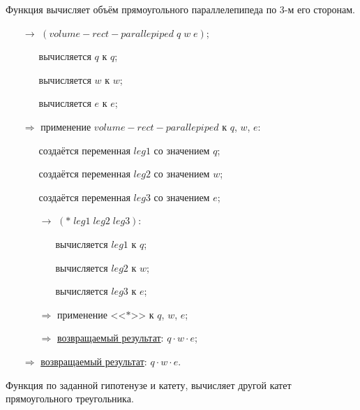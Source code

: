\problem Функция вычисляет объём прямоугольного параллелепипеда по 3-м его сторонам.\\[0.1cm]

\vspace{0.2cm}

\begin{itemize}
	\item[$\longrightarrow$] $(volume\!-\!rect\!-\!parallepiped\; q\; w\; e)$;
	\begin{itemize}
		\item[\textbullet] вычисляется $q$ к $q$;
		\item[\textbullet] вычисляется $w$ к $w$;
		\item[\textbullet] вычисляется $e$ к $e$;
	\end{itemize}
	\item[$\Longrightarrow$] применение $volume\!-\!rect\!-\!parallepiped$ к $q$, $w$, $e$:
	\begin{itemize}
		\item[\textbullet] создаётся переменная $leg1$ со значением $q$;
		\item[\textbullet] создаётся переменная $leg2$ со значением $w$;
		\item[\textbullet] создаётся переменная $leg3$ со значением $e$;
		\item[$\longrightarrow$] $(*\; leg1\; leg2\; leg3)$:
		\begin{itemize}
			\item[\textbullet] вычисляется $leg1$ к $q$;
			\item[\textbullet] вычисляется $leg2$ к $w$;
			\item[\textbullet] вычисляется $leg3$ к $e$;
		\end{itemize}
		\item[$\Longrightarrow$] применение <<$*$>> к $q$, $w$, $e$;
		\item[$\Longrightarrow$] \underline{возвращаемый результат}: $q \cdot w \cdot e$;
	\end{itemize}
	\item[$\Longrightarrow$] \underline{возвращаемый результат}: $q \cdot w \cdot e$.
\end{itemize}


\newpage
\problem Функция по заданной гипотенузе и катету, вычисляет другой катет прямоугольного треугольника.\\[0.1cm]


